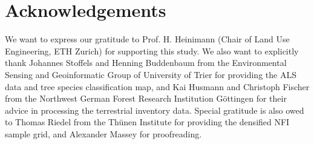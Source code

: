 
\section*{Acknowledgements}
\thispagestyle{plain}
We want to express our gratitude to Prof. H. Heinimann (Chair of Land Use Engineering, ETH Zurich) for supporting this study. We also want to explicitly thank Johannes Stoffels and Henning Buddenbaum from the Environmental Sensing and Geoinformatic Group of University of Trier for providing the ALS data and tree species classification map, and Kai Husmann and Christoph Fischer from the Northwest German Forest Research Institution Göttingen for their advice in processing the terrestrial inventory data. Special gratitude is also owed to Thomas Riedel from the Th{\"u}nen Institute for providing the densified NFI sample grid, and Alexander Massey for proofreading.
